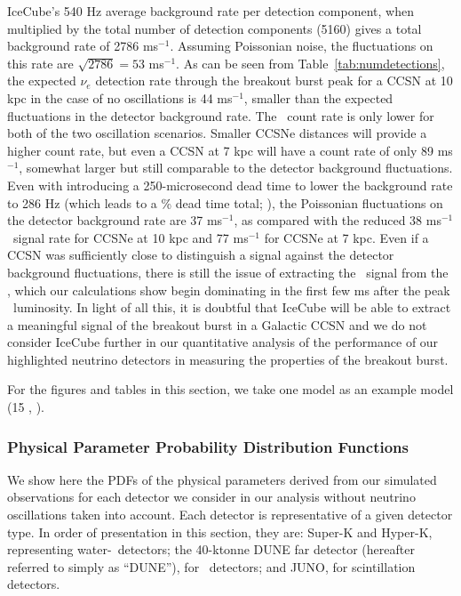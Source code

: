 IceCube's 540 Hz average background rate per detection component, when 
    multiplied by the total number of detection components (5160) gives a total 
    background rate of 2786 ms$^{-1}$.  Assuming Poissonian noise, the fluctuations
    on this rate are $\sqrt{2786} = 53$ ms$^{-1}$.  As can be seen from Table~\ref{tab:numdetections}, the 
    expected $\nu_e$ detection rate through the breakout burst peak for a CCSN at 
    10 kpc in the case of no oscillations is 44 ms$^{-1}$, smaller than the expected fluctuations in the detector 
    background rate.  The \nue\ count rate is only lower for both
    of the two oscillation scenarios.  Smaller CCSNe distances will provide a higher count rate,
    but even a CCSN at 7 kpc will have a count rate of only 89 ms$^{-1}$, somewhat 
    larger but still comparable to the detector background fluctuations.  Even with 
    introducing a 250-microsecond dead time to lower the background rate to 
    286 Hz (which leads to a \% dead time total; \citealt{abbasietal2011}), the 
    Poissonian fluctuations on the detector background rate are 37 ms$^{-1}$, as 
    compared with the reduced 38 ms$^{-1}$ \nue\ signal rate for CCSNe at 10 
    kpc and 77 ms$^{-1}$ for CCSNe at 7 kpc.  Even if a CCSN was sufficiently 
    close to distinguish a signal against the detector background fluctuations, there 
    is still the issue of extracting the \nue\ signal from the
    \backgrounds, 
which our calculations show begin dominating in the first few ms 
    after the peak \nue\ luminosity.  In light of all this, it is doubtful that IceCube
    will be able to extract a meaningful signal of the breakout burst in a Galactic
    CCSN and we do not consider IceCube further in our quantitative analysis of the
    performance of our highlighted neutrino detectors in measuring the properties of the
    breakout burst.


For the figures and tables in this section, 
we take one model as an example model (15 \Msol, \ls).


\subsubsection{Physical Parameter Probability Distribution Functions}

We show here the PDFs of the
physical parameters derived from our simulated observations for each
detector we consider in our analysis without neutrino oscillations
taken into account.  Each detector is representative
of a given detector type.  In order of presentation in this section,
they are: Super-K and
Hyper-K, representing water-\cer\ detectors; the 40-ktonne DUNE far
detector (hereafter referred to simply as ``DUNE''), 
for \ detectors; and JUNO, for scintillation detectors.

